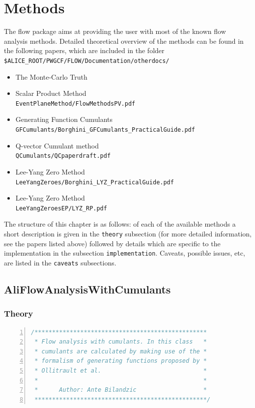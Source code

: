 \documentclass[a4paper]{book}
\numberwithin{equation}{subsection}
\begin{document}
\chapter{Methods}
\label{Methods}
The flow package aims at providing the user with most of the known flow analysis methods. Detailed theoretical overview of the methods can be found in the following papers, which are included in the folder \texttt{\$ALICE\_ROOT/PWGCF/FLOW/Documentation/otherdocs/}
\begin{itemize}
	\item The Monte-Carlo Truth
	\item Scalar Product Method \\ \hspace*{1cm} \texttt{EventPlaneMethod/FlowMethodsPV.pdf}
	\item Generating Function Cumulants \\ \hspace*{1cm} \texttt{GFCumulants/Borghini\_GFCumulants\_PracticalGuide.pdf}
	\item Q-vector Cumulant method \\ \hspace*{1cm} \texttt{QCumulants/QCpaperdraft.pdf} 
        \item Lee-Yang Zero Method \\ \hspace*{1cm} \texttt{LeeYangZeroes/Borghini\_LYZ\_PracticalGuide.pdf}
	\item Lee-Yang Zero Method \\ \hspace*{1cm} \texttt{LeeYangZeroesEP/LYZ\_RP.pdf}
\end{itemize}
The structure of this  chapter is as follows: of each of the available methods a short description is given in the \texttt{theory} subsection (for more detailed information, see the papers listed above) followed by details which are specific to the implementation in the subsection \texttt{implementation}. Caveats, possible issues, etc, are listed in the \texttt{caveats} subsections. 

\section{AliFlowAnalysisWithCumulants}
\subsection{Theory}
\begin{lstlisting}[language=C, numbers=left]
/************************************************* 
 * Flow analysis with cumulants. In this class   *
 * cumulants are calculated by making use of the *
 * formalism of generating functions proposed by *
 * Ollitrault et al.                             *
 *                                               * 
 *      Author: Ante Bilandzic                   * 
 *************************************************/ \end{lstlisting}
\end{document}
